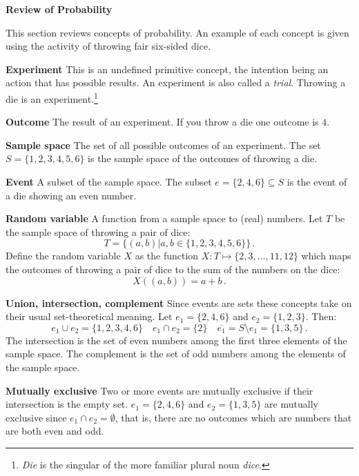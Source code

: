 

\newpage

\begin{center}
\textbf{\LARGE Review of Probability}
\end{center}

This section reviews concepts of probability. An example of each concept is given using the activity of throwing fair six-sided dice.

\textbf{Experiment} This is an undefined primitive concept, the intention being an action that has possible results. An experiment is also called a \emph{trial}. Throwing a die is an experiment.\footnote{\emph{Die} is the singular of the more familiar plural noun \emph{dice}.}

\textbf{Outcome} The result of an experiment. If you throw a die one outcome is $4$.

\textbf{Sample space} The set of all possible outcomes of an experiment. The set $S=\{1,2,3,4,5,6\}$ is the sample space of the outcomes of throwing a die.

\textbf{Event} A subset of the sample space. The subset $e=\{2,4,6\}\subseteq S$ is the event of a die showing an even number.

\textbf{Random variable} A function from a sample space to (real) numbers. Let $T$ be the sample space of throwing a pair of dice:
\[
T=\{(a,b)| a,b\in \{1,2,3,4,5,6\} \}\,.
\]
Define the random variable $X$ as the function $X:T \mapsto \{2,3,\ldots,11,12\}$ which maps the outcomes of throwing a pair of dice to the sum of the numbers on the dice:
\begin{equation}\label{eq.sum}
X((a,b)) = a+b\,.
\end{equation}

\textbf{Union, intersection, complement} Since events are sets these concepts take on their usual set-theoretical meaning. Let  $e_1=\{2,4,6\}$ and $e_2=\{1,2,3\}$. Then:
\[
e_1 \cup e_2=\{1,2,3,4,6\}\quad e_1 \cap e_2=\{2\}\quad \overline{e_1} = S\setminus e_1=\{1,3,5\}\,.
\]
The intersection is the set of even numbers among the first three elements of the sample space. The complement is the set of odd numbers among the elements of the sample space.

\textbf{Mutually exclusive} Two or more events are mutually exclusive if their intersection is the empty set. $e_1=\{2,4,6\}$ and $e_2=\{1,3,5\}$ are mutually exclusive since $e_1 \cap e_2=\emptyset$, that is, there are no outcomes which are numbers that are both even and odd.

